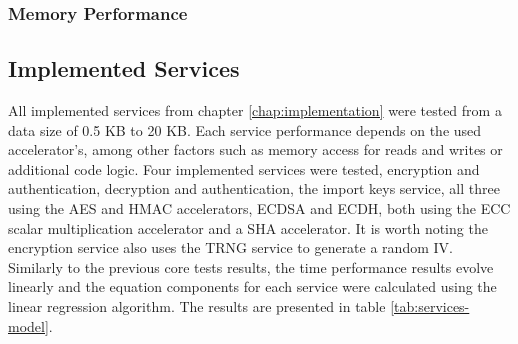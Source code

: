 \subsubsection{Memory Performance}\label{chap:evaluation:services:memory}



\subsection{Implemented Services}\label{chap:evaluation:services}

All implemented services from chapter \ref{chap:implementation} were tested from a data size of 0.5 KB to 20 KB. Each service performance depends on the used accelerator's, among other factors such as memory access for reads and writes or additional code logic.
Four implemented services were tested, encryption and authentication, decryption and authentication, the import keys service, all three using the \ac{AES} and \ac{HMAC} accelerators, \ac{ECDSA} and \ac{ECDH}, both using the \ac{ECC} scalar multiplication accelerator and a \ac{SHA} accelerator. It is worth noting the encryption service also uses the \ac{TRNG} service to generate a random \ac{IV}.
Similarly to the previous core tests results, the time performance results evolve linearly and the equation components for each service were calculated using the linear regression algorithm. The results are presented in table \ref{tab:services-model}.



